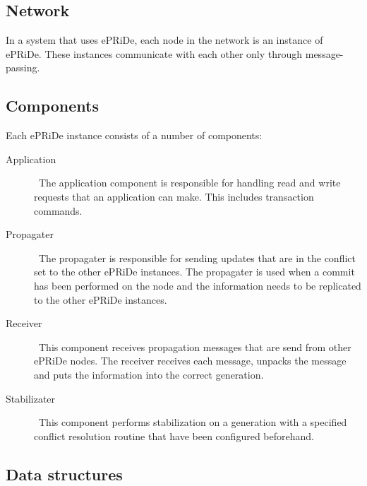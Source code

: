 


\subsection{Network} %
\label{sub:network}

In a system that uses ePRiDe, each node in the network is an instance of ePRiDe. These instances communicate with each other only through message-passing. 

\subsection{Components} %
\label{sub:components}

Each ePRiDe instance consists of a number of components:

\begin{description}
	\item[Application] \
		The application component is responsible for handling read and write requests that an application can make. This includes transaction commands.
		
	\item[Propagater] \
		The propagater is responsible for sending updates that are in the conflict set to the other ePRiDe instances. The propagater is used  when a commit has been performed on the node and the information needs to be replicated to the other ePRiDe instances.
		
	\item[Receiver] \
		This component receives propagation messages that are send from other ePRiDe nodes. The receiver receives each message, unpacks the message and puts the information into the correct generation.
		
	\item[Stabilizater] \
		This component performs stabilization on a generation with a specified conflict resolution routine that have been configured beforehand.
\end{description}


\subsection{Data structures} %
\label{sub:datastructures}

